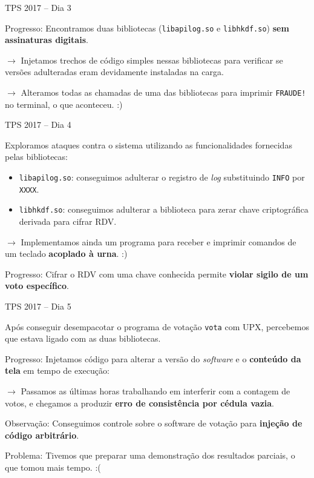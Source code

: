 \documentclass[10pt]{beamer}
\begin{document}
\begin{frame}{TPS 2017 -- Dia 3}

\alert{Progresso:} Encontramos duas bibliotecas (\texttt{libapilog.so} e \texttt{libhkdf.so}) {\bf sem assinaturas digitais}.

\bigskip

\alert{$\rightarrow$} Injetamos trechos de código simples nessas bibliotecas para verificar se versões adulteradas eram devidamente instaladas na carga.

\bigskip

\alert{$\rightarrow$} Alteramos todas as chamadas de uma das bibliotecas para imprimir \texttt{FRAUDE!} no terminal, o que aconteceu. :)

\end{frame}

\begin{frame}{TPS 2017 -- Dia 4}

Exploramos ataques contra o sistema utilizando as funcionalidades fornecidas pelas bibliotecas:
\begin{itemize}
 \item \texttt{libapilog.so}: conseguimos adulterar o registro de \emph{log} substituindo \texttt{INFO} por \texttt{XXXX}.
 \item \texttt{libhkdf.so}: conseguimos adulterar a biblioteca para zerar chave criptográfica derivada para cifrar RDV.
\end{itemize}

\alert{$\rightarrow$} Implementamos ainda um programa para receber e imprimir comandos de um teclado {\bf acoplado à urna}. :)

\medskip

\alert{Progresso:} Cifrar o RDV com uma chave conhecida permite \textbf{violar sigilo de um voto específico}.

\end{frame}

\begin{frame}{TPS 2017 -- Dia 5}

Após conseguir desempacotar o programa de votação \texttt{vota} com UPX, percebemos que estava ligado com as duas bibliotecas.

\bigskip

\alert{Progresso:} Injetamos código para alterar a versão do \emph{software} e o {\bf conteúdo da tela} em tempo de execução:

\bigskip

\alert{$\rightarrow$} Passamos as últimas horas trabalhando em interferir com a contagem de votos, e chegamos a produzir \textbf{erro de consistência por cédula vazia}.

\bigskip

\alert{Observação:} Conseguimos controle sobre o software de votação para {\bf injeção de código arbitrário}.

\bigskip

\alert{Problema:} Tivemos que preparar uma demonstração dos resultados parciais, o que tomou mais tempo. :(

\end{frame}
\end{document}
